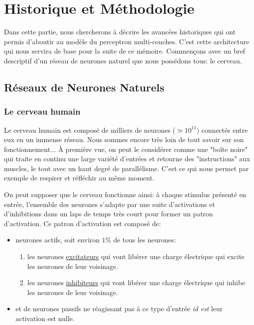 \section{Historique et Méthodologie}

Dans cette partie, nous chercherons à décrire les avancées historiques qui ont
permis d'aboutir au modèle du perceptron multi-couches. C'est cette
architecture qui nous servira de base pour la suite de ce mémoire. Commençons
avec un bref descriptif d'un réseau de neurones naturel que nous possédons
tous: le cerveau.

\subsection{Réseaux de Neurones Naturels}

\subsubsection{Le cerveau humain}

Le cerveau humain est composé de milliers de neurones ($\simeq 10^{11}$)
connectés entre eux en un immense réseau. Nous sommes encore très loin de tout
savoir sur son fonctionnement... À première vue, on peut le considérer comme
une "boîte noire" qui traite en continu une large variété d'entrées et retourne
des "instructions" aux muscles, le tout avec un haut degré de parallélisme.
C'est ce qui nous permet par exemple de respirer et réfléchir au même moment.

On peut supposer que le cerveau fonctionne ainsi: à chaque stimulus présenté en
entrée, l'ensemble des neurones s'adapte par une suite d'activations et
d'inhibitions dans un laps de temps très court pour former un patron
d'activation. Ce patron d'activation est composé de: \\

\begin{itemize}
\item neurones actifs, soit environ $1\%$ de tous les neurones:
\begin{enumerate}
\item les neurones \underline{excitateurs} qui vont libérer une charge électrique qui excite les neurones de leur voisinage.
\item les neurones \underline{inhibiteurs} qui vont libérer une charge électrique qui inhibe les neurones de leur voisinage.
\end{enumerate}
\item et de neurones passifs ne réagissant pas à ce type d'entrée \textit{id est} leur activation est nulle.
\\
\end{itemize}

